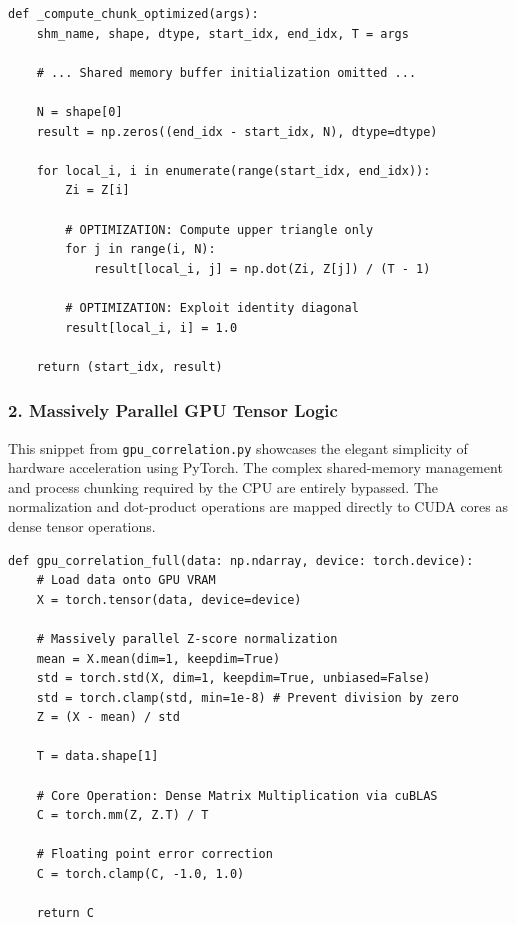 \begin{verbatim}
def _compute_chunk_optimized(args):
    shm_name, shape, dtype, start_idx, end_idx, T = args
    
    # ... Shared memory buffer initialization omitted ...
    
    N = shape[0]
    result = np.zeros((end_idx - start_idx, N), dtype=dtype)

    for local_i, i in enumerate(range(start_idx, end_idx)):
        Zi = Z[i]

        # OPTIMIZATION: Compute upper triangle only
        for j in range(i, N):  
            result[local_i, j] = np.dot(Zi, Z[j]) / (T - 1)

        # OPTIMIZATION: Exploit identity diagonal
        result[local_i, i] = 1.0

    return (start_idx, result)
\end{verbatim}

\vspace{0.5cm}

\subsubsection*{2. Massively Parallel GPU Tensor Logic}
This snippet from \verb|gpu_correlation.py| showcases the elegant simplicity of hardware acceleration using PyTorch. The complex shared-memory management and process chunking required by the CPU are entirely bypassed. The normalization and dot-product operations are mapped directly to CUDA cores as dense tensor operations.

\begin{verbatim}
def gpu_correlation_full(data: np.ndarray, device: torch.device):
    # Load data onto GPU VRAM
    X = torch.tensor(data, device=device)
    
    # Massively parallel Z-score normalization
    mean = X.mean(dim=1, keepdim=True)
    std = torch.std(X, dim=1, keepdim=True, unbiased=False)
    std = torch.clamp(std, min=1e-8) # Prevent division by zero
    Z = (X - mean) / std

    T = data.shape[1]
    
    # Core Operation: Dense Matrix Multiplication via cuBLAS
    C = torch.mm(Z, Z.T) / T
    
    # Floating point error correction
    C = torch.clamp(C, -1.0, 1.0) 

    return C
\end{verbatim}




